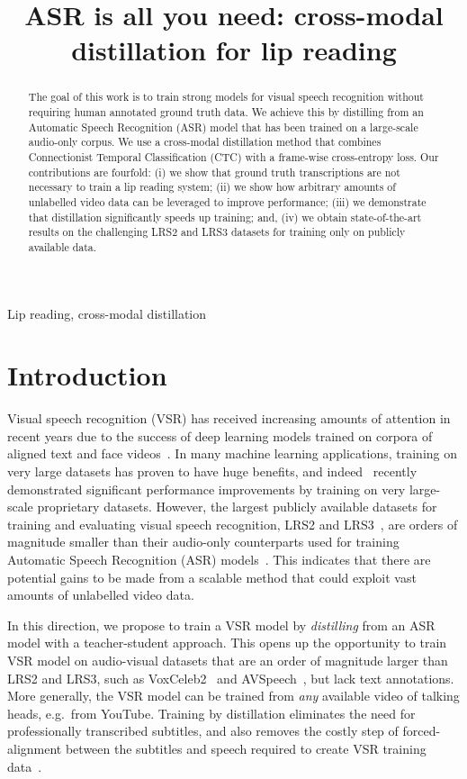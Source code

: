 \documentclass{article}
\title{ASR is all you need: cross-modal distillation for lip reading}
\def\psec{\vspace{-4pt}}
\begin{document}
\maketitle
\begin{abstract}
The goal of this work is to train strong models for visual speech recognition
without requiring human annotated ground truth  data.
We achieve this by distilling from an Automatic Speech Recognition (ASR) model that has been trained on a large-scale audio-only corpus.
We use a cross-modal distillation method that combines Connectionist Temporal Classification (CTC) with a frame-wise cross-entropy loss.
Our contributions are fourfold:
(i) we show that ground truth transcriptions are not necessary to train a lip reading system;
(ii) we show how arbitrary amounts of unlabelled video data can be leveraged to improve performance;
(iii) we demonstrate that distillation significantly speeds up training;
and, (iv) we obtain state-of-the-art results on the
challenging LRS2 and LRS3 datasets for training only on publicly available data.
\end{abstract}
\begin{keywords}
  Lip reading, cross-modal distillation
\end{keywords}
\psec
\psec
\section{Introduction}
\label{sec:intro}
\psec



Visual speech recognition (VSR) has received increasing amounts of
attention in recent years due to the success of deep learning
models trained on corpora of aligned text and face videos~\cite{Assael16,Chung16,Chung17}.
In many machine learning applications, training on very large datasets has proven to have
huge benefits,  and indeed~\cite{Shillingford18,makino2019recurrent} recently demonstrated significant performance
improvements by training on very large-scale proprietary datasets.
However, the largest publicly available datasets for training and evaluating visual speech
recognition, LRS2 and LRS3~\cite{Chung17,Afouras18d},  are orders of magnitude smaller than
their audio-only counterparts used for training Automatic Speech Recognition (ASR) models~\cite{panayotov2015librispeech,Baumann2018}.
This indicates that there are potential gains to be made from a scalable method that
could exploit vast amounts of unlabelled video data.

In this direction, we propose to train a VSR model by {\em distilling} from an ASR model with a
teacher-student approach.
This opens up the opportunity to train VSR model on audio-visual datasets that are an order of magnitude larger
than LRS2 and LRS3, such as VoxCeleb2~\cite{Chung18a} and AVSpeech~\cite{ephrat2018looking}, 
but  lack text annotations. More generally, the VSR model can be trained from {\em any} available video of
talking heads, e.g.\ from YouTube. Training by distillation eliminates the need for
professionally transcribed subtitles, and also removes the costly step of
forced-alignment between the subtitles and  speech required to create VSR training data~\cite{Chung16}.
\end{document}
